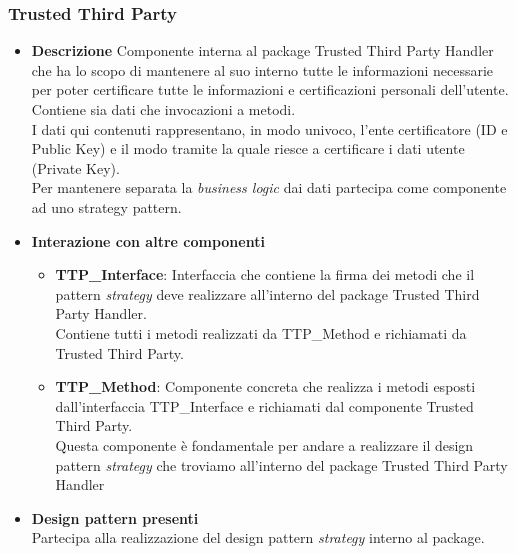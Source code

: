 \subsubsection{Trusted Third Party}
\begin{itemize}
	\item \textbf{Descrizione}
	Componente interna al package Trusted Third Party Handler che ha lo scopo di mantenere al suo interno tutte le informazioni necessarie per poter certificare tutte le informazioni e certificazioni personali dell'utente.\\
	Contiene sia dati che invocazioni a metodi.\\
	I dati qui contenuti rappresentano, in modo univoco, l'ente certificatore (ID e Public Key) e il modo tramite la quale riesce a certificare i dati utente (Private Key).\\
	Per mantenere separata la \textit{business logic} dai dati partecipa come componente ad uno strategy pattern.
	\item \textbf{Interazione con altre componenti}
	\begin{itemize}
		\item \textbf{TTP\_Interface}: Interfaccia che contiene la firma dei metodi che il pattern \textit{strategy} deve realizzare all'interno del package Trusted Third Party Handler.\\
		Contiene tutti i metodi realizzati da TTP\_Method e richiamati da Trusted Third Party.		
		\item \textbf{TTP\_Method}: Componente concreta che realizza i metodi esposti dall'interfaccia TTP\_Interface e richiamati dal componente Trusted Third Party.\\
		Questa componente è fondamentale per andare a realizzare il design pattern \textit{strategy} che troviamo all'interno del package Trusted Third Party Handler
	\end{itemize}
	\item \textbf{Design pattern presenti}\\
	Partecipa alla realizzazione del design pattern \textit{strategy} interno al package.
\end{itemize}
\newpage
